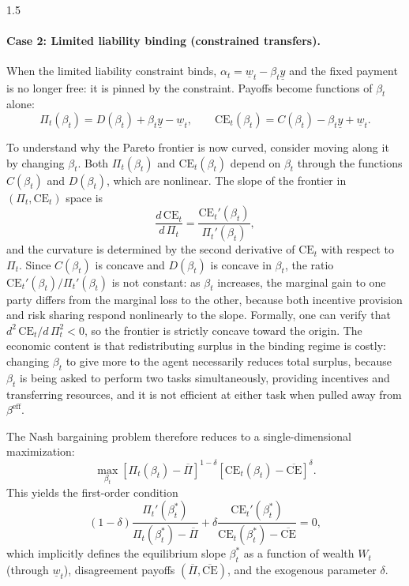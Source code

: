 \documentclass[12pt]{article}
\theoremstyle{definition}
\theoremstyle{plain}
\begin{document}
\begin{spacing}{1.5}
\paragraph{Case 2: Limited liability binding (constrained transfers).}

When the limited liability constraint binds, $\alpha_t = \underline{w}_t - \beta_t \underline{y}$ and the fixed payment is no longer free: it is pinned by the constraint. Payoffs become functions of $\beta_t$ alone:
\[
\Pi_t(\beta_t) = D(\beta_t) + \beta_t \underline{y} - \underline{w}_t, \qquad \text{CE}_t(\beta_t) = C(\beta_t) - \beta_t \underline{y} + \underline{w}_t.
\]

To understand why the Pareto frontier is now curved, consider moving along it by changing $\beta_t$. Both $\Pi_t(\beta_t)$ and $\text{CE}_t(\beta_t)$ depend on $\beta_t$ through the functions $C(\beta_t)$ and $D(\beta_t)$, which are nonlinear. The slope of the frontier in $(\Pi_t, \text{CE}_t)$ space is
\[
\frac{d\,\text{CE}_t}{d\,\Pi_t} = \frac{\text{CE}_t'(\beta_t)}{\Pi_t'(\beta_t)},
\]
and the curvature is determined by the second derivative of $\text{CE}_t$ with respect to $\Pi_t$. Since $C(\beta_t)$ is concave and $D(\beta_t)$ is concave in $\beta_t$, the ratio $\text{CE}_t'(\beta_t)/\Pi_t'(\beta_t)$ is not constant: as $\beta_t$ increases, the marginal gain to one party differs from the marginal loss to the other, because both incentive provision and risk sharing respond nonlinearly to the slope. Formally, one can verify that $d^2\,\text{CE}_t / d\,\Pi_t^2 < 0$, so the frontier is strictly concave toward the origin. The economic content is that redistributing surplus in the binding regime is costly: changing $\beta_t$ to give more to the agent necessarily reduces total surplus, because $\beta_t$ is being asked to perform two tasks simultaneously, providing incentives and transferring resources, and it is not efficient at either task when pulled away from $\beta^{\text{eff}}$.

The Nash bargaining problem therefore reduces to a single-dimensional maximization:
\[
\max_{\beta_t} [\Pi_t(\beta_t) - \overline{\Pi}]^{1-\delta} [\text{CE}_t(\beta_t) - \overline{\text{CE}}]^{\delta}.
\]
This yields the first-order condition
\begin{equation}\label{eq:foc_binding}
(1-\delta) \frac{\Pi_t'(\beta_t^*)}{\Pi_t(\beta_t^*) - \overline{\Pi}} + \delta \frac{\text{CE}_t'(\beta_t^*)}{\text{CE}_t(\beta_t^*) - \overline{\text{CE}}} = 0,
\end{equation}
which implicitly defines the equilibrium slope $\beta_t^*$ as a function of wealth $W_t$ (through $\underline{w}_t$), disagreement payoffs $(\overline{\Pi}, \overline{\text{CE}})$, and the exogenous parameter $\delta$.


\end{spacing}
\end{document}
